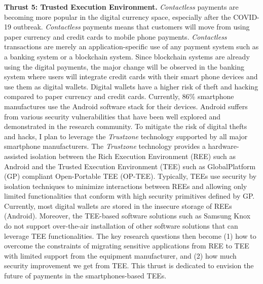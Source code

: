 \documentclass{NSF}
\newcommand{\BfPara}[1]{{\noindent\textbf{#1.}}\xspace}
\begin{document}
\BfPara{Thrust 5: Trusted Execution Environment} {\em Contactless} payments are becoming more popular in the digital currency space, especially after the COVID-19 outbreak. {\em Contactless} payments means that customers will move from using paper currency and credit cards to mobile phone payments. {\em Contactless} transactions are merely an application-specific use of any payment system such as a banking system or a blockchain system. Since blockchain systems are already using the digital payments, the major change will be observed in the banking system where users will integrate credit cards with their smart phone devices and use them as digital wallets. Digital wallets have a higher risk of theft and hacking compared to paper currency and credit cards. Currently, 86\% smartphone manufactures use the Android software stack for their devices. Android suffers from various security vulnerabilities that have been well explored and demonstrated in the research community. To mitigate the risk of digital thefts and hacks, I plan to leverage the {\em Trustzone} technology supported by all major smartphone manufacturers. The {\em Trustzone} technology provides a hardware-assisted isolation between the Rich Execution Environment (REE) such as Android and the Trusted Execution Environment (TEE) such as GlobalPlatform (GP) compliant Open-Portable TEE (OP-TEE). Typically, TEEs use security by isolation techniques to minimize interactions between REEs and allowing only limited functionalities that conform with high security primitives defined by GP. Currently, most digital wallets are stored in the insecure storage of REEs (Android). Moreover, the TEE-based software solutions such as Samsung Knox do not support over-the-air installation of other software solutions that can leverage TEE functionalities. The key research questions then become (1) how to overcome the constraints of migrating sensitive applications from REE to TEE with limited support from the equipment manufacturer, and (2) how much security improvement we get from TEE. This thrust is dedicated to envision the future of payments in the smartphones-based TEEs. 

\end{document}
